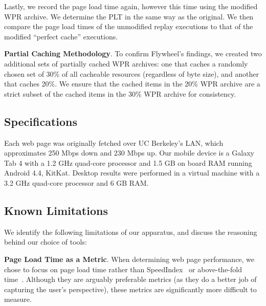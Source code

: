 Lastly, we record the page load time again, however this time using the modified WPR archive. We determine the PLT in the same way as the original. We then compare the page load times of the unmodified replay executions to that of the modified ``perfect cache'' executions.

\textbf{Partial Caching Methodology}. To confirm Flywheel's findings, we created two additional sets of partially cached WPR archives: one that caches a randomly chosen set of 30\% of all cacheable resources (regardless of byte size), and another that caches 20\%.
We ensure that the cached items in the 20\% WPR archive are a strict subset of the cached items in the 30\% WPR archive for consistency. 
\subsection{Specifications} \label{specs}
Each web page was originally fetched over UC Berkeley's LAN, which approximates 250 Mbps down and 230 Mbps up.
Our mobile device is a Galaxy Tab 4 with a 1.2 GHz quad-core processor and 1.5 GB on board RAM running Android 4.4, KitKat. Desktop results were performed in a virtual machine with a 3.2 GHz quad-core processor and 6 GB RAM.
\subsection{Known Limitations}  \label{known_limitations}
We identify the following limitations of our apparatus, and discuss the reasoning behind our choice of tools:

\textbf{Page Load Time as a Metric}. When determining web page performance, we chose to focus on page load time rather than SpeedIndex~\cite{speed-index} or above-the-fold time~\cite{above-the-fold}.
Although they are arguably preferable metrics (as they do a better job of
capturing the user's perspective), these metrics are significantly more
difficult to measure.%

